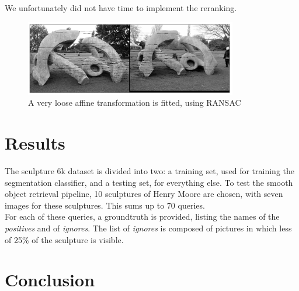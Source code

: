 \documentclass{article}
\begin{document}
We unfortunately did not have time to implement the reranking.

\begin{figure}
\label{ransac}
\begin{center}
\includegraphics[width=350px]{images/matching_01.png}
\end{center}
\caption{A very loose affine transformation is fitted, using RANSAC}
\end{figure}

\section{Results}

The sculpture 6k dataset is divided into two: a training set, used for
training the segmentation classifier, and a testing set, for everything else.
To test the smooth object retrieval pipeline, 10 sculptures of Henry Moore are
chosen, with seven images for these sculptures. This sums up to 70 queries. \\
For each of these queries, a groundtruth is provided, listing the names of the
\textit{positives} and of \textit{ignores}. The list of \textit{ignores} is
composed of pictures in which less of 25\% of the sculpture is visible.

\section{Conclusion}


\end{document}
